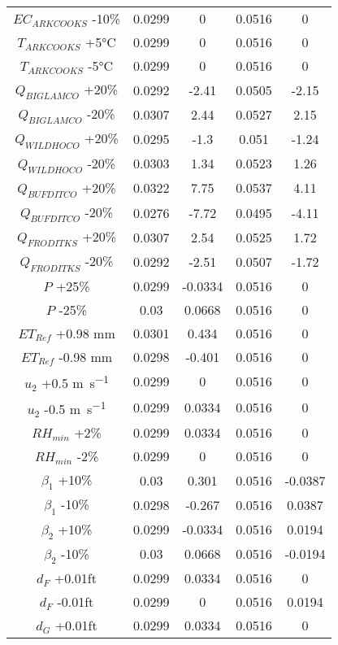 \begin{spacing}{1.0}
\begin{center}
\begin{longtable}{ccccc}
			$EC_{ARKCOOKS} $ -10\% & 0.0299 & 0 & 0.0516 & 0 \\
			$T_{ARKCOOKS} $ +5\si{\degreeCelsius}& 0.0299 & 0 & 0.0516 & 0 \\
			$T_{ARKCOOKS} $ -5\si{\degreeCelsius}& 0.0299 & 0 & 0.0516 & 0 \\
			$Q_{BIGLAMCO} $ +20\% & 0.0292 & -2.41 & 0.0505 & -2.15 \\
			$Q_{BIGLAMCO} $ -20\% & 0.0307 & 2.44 & 0.0527 & 2.15 \\
			$Q_{WILDHOCO} $ +20\% & 0.0295 & -1.3 & 0.051 & -1.24 \\
			$Q_{WILDHOCO} $ -20\% & 0.0303 & 1.34 & 0.0523 & 1.26 \\
			$Q_{BUFDITCO} $ +20\% & 0.0322 & 7.75 & 0.0537 & 4.11 \\
			$Q_{BUFDITCO} $ -20\% & 0.0276 & -7.72 & 0.0495 & -4.11 \\
			$Q_{FRODITKS} $ +20\% & 0.0307 & 2.54 & 0.0525 & 1.72 \\
			$Q_{FRODITKS} $ -20\% & 0.0292 & -2.51 & 0.0507 & -1.72 \\
			$P$ +25\% & 0.0299 & -0.0334 & 0.0516 & 0 \\
			$P$ -25\% & 0.03 & 0.0668 & 0.0516 & 0 \\
			$ET_{Ref} $ +0.98 \si{\milli\meter} & 0.0301 & 0.434 & 0.0516 & 0 \\
			$ET_{Ref} $ -0.98 \si{\milli\meter} & 0.0298 & -0.401 & 0.0516 & 0 \\
			$u_{2} $ +0.5 \si{\meter\per\second} & 0.0299 & 0 & 0.0516 & 0 \\
			$u_{2} $ -0.5 \si{\meter\per\second} & 0.0299 & 0.0334 & 0.0516 & 0 \\
			$RH_{min} $ +2\% & 0.0299 & 0.0334 & 0.0516 & 0 \\
			$RH_{min} $ -2\% & 0.0299 & 0 & 0.0516 & 0 \\
			$\beta_{1} $ +10\% & 0.03 & 0.301 & 0.0516 & -0.0387 \\
			$\beta_{1} $ -10\% & 0.0298 & -0.267 & 0.0516 & 0.0387 \\
			$\beta_{2} $ +10\% & 0.0299 & -0.0334 & 0.0516 & 0.0194 \\
			$\beta_{2} $ -10\% & 0.03 & 0.0668 & 0.0516 & -0.0194 \\
			$d_{F} $ +0.01ft & 0.0299 & 0.0334 & 0.0516 & 0 \\
			$d_{F} $ -0.01ft & 0.0299 & 0 & 0.0516 & 0.0194 \\
			$d_{G} $ +0.01ft & 0.0299 & 0.0334 & 0.0516 & 0 \\

\end{longtable}
\end{center}
\end{spacing}
